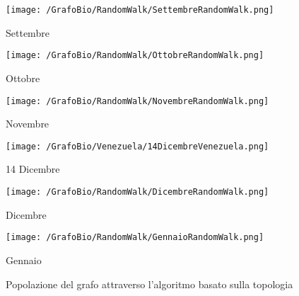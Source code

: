 \begin{figure}[!htbp]
\centering
\begin{minipage}[c]{.40\textwidth}
\centering\setlength{\captionmargin}{0pt}%
\texttt{[image: /GrafoBio/RandomWalk/SettembreRandomWalk.png]}
\caption{Settembre}
\label{Passo0}
\end{minipage}%
\hspace{10mm}%
\begin{minipage}[c]{.40\textwidth}
\centering\setlength{\captionmargin}{0pt}%
\texttt{[image: /GrafoBio/RandomWalk/OttobreRandomWalk.png]}
\caption{Ottobre}
\label{Passo1}
\end{minipage}
\hspace{10mm}%
\begin{minipage}[c]{.40\textwidth}
\centering\setlength{\captionmargin}{0pt}%
\texttt{[image: /GrafoBio/RandomWalk/NovembreRandomWalk.png]}
\caption{Novembre}
\label{Passo2}
\end{minipage}
\hspace{10mm}%
\begin{minipage}[c]{.40\textwidth}
\centering\setlength{\captionmargin}{0pt}%
\texttt{[image: /GrafoBio/Venezuela/14DicembreVenezuela.png]}
\caption{14 Dicembre}
\label{Passo3}
\end{minipage}
\hspace{10mm}%
\begin{minipage}[c]{.40\textwidth}
\centering\setlength{\captionmargin}{0pt}%
\texttt{[image: /GrafoBio/RandomWalk/DicembreRandomWalk.png]}
\caption{Dicembre}
\label{Passo3}
\end{minipage}
\hspace{10mm}%
\begin{minipage}[c]{.40\textwidth}
\centering\setlength{\captionmargin}{0pt}%
\texttt{[image: /GrafoBio/RandomWalk/GennaioRandomWalk.png]}
\caption{Gennaio}
\label{Passo3}
\end{minipage}
\caption{Popolazione del grafo attraverso l'algoritmo basato sulla topologia}\label{grafoTopologiaBio}
\end{figure}


